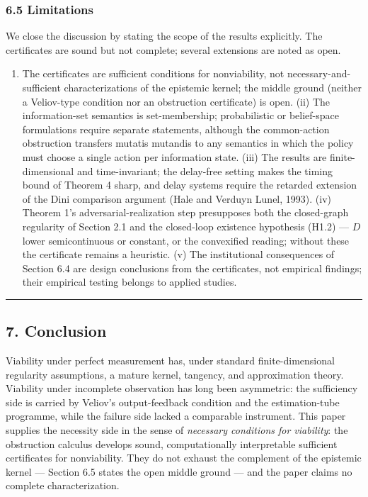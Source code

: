 \documentclass[11pt]{article}
\providecommand{\tightlist}{\setlength{\itemsep}{0pt}\setlength{\parskip}{0pt}}
\begin{document}
\subsubsection{6.5 Limitations}\label{limitations}

We close the discussion by stating the scope of the results explicitly.
The certificates are sound but not complete; several extensions are
noted as open.

\begin{enumerate}
\def\labelenumi{(\roman{enumi})}
\tightlist
\item
  The certificates are sufficient conditions for nonviability, not
  necessary-and-sufficient characterizations of the epistemic kernel;
  the middle ground (neither a Veliov-type condition nor an obstruction
  certificate) is open. (ii) The information-set semantics is
  set-membership; probabilistic or belief-space formulations require
  separate statements, although the common-action obstruction transfers
  mutatis mutandis to any semantics in which the policy must choose a
  single action per information state. (iii) The results are
  finite-dimensional and time-invariant; the delay-free setting makes
  the timing bound of Theorem 4 sharp, and delay systems require the
  retarded extension of the Dini comparison argument (Hale and Verduyn
  Lunel, 1993). (iv) Theorem 1's adversarial-realization step
  presupposes both the closed-graph regularity of Section 2.1 and the
  closed-loop existence hypothesis (H1.2) --- \(D\) lower semicontinuous
  or constant, or the convexified reading; without these the certificate
  remains a heuristic. (v) The institutional consequences of Section 6.4
  are design conclusions from the certificates, not empirical findings;
  their empirical testing belongs to applied studies.
\end{enumerate}

\begin{center}\rule{0.5\linewidth}{0.5pt}\end{center}

\subsection{7. Conclusion}\label{conclusion}

Viability under perfect measurement has, under standard
finite-dimensional regularity assumptions, a mature kernel, tangency,
and approximation theory. Viability under incomplete observation has
long been asymmetric: the sufficiency side is carried by Veliov's
output-feedback condition and the estimation-tube programme, while the
failure side lacked a comparable instrument. This paper supplies the
necessity side in the sense of \emph{necessary conditions for
viability}: the obstruction calculus develops sound, computationally
interpretable sufficient certificates for nonviability. They do not
exhaust the complement of the epistemic kernel --- Section 6.5 states
the open middle ground --- and the paper claims no complete
characterization.
\end{document}
